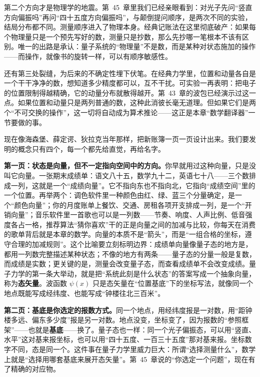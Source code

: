 第二个方向才是物理学的地震。第~45~章里我们已经亲眼看到：对光子先问“竖直方向偏振吗”再问“四十五度方向偏振吗”，与颠倒提问顺序，是两次不同的实验，结局分布都不同。测量顺序进入了物理本身。经典记账法在这里彻底破产：如果每个物理量只是一个预先写好的数，测量只是抄数，那么先抄哪一笔根本不该有区别。唯一的出路是承认：量子系统的“物理量”不是数，而是某种对状态施加的操作——而操作，就像书的旋转一样，可以有顺序敏感性。

还有第三处裂缝，为后来的不确定性埋下伏笔。在经典力学里，位置和动量各自是一个干干净净的数，想知道多少精度都可以，互不干扰。可实验一再表明：把电子的位置限制得越精确，它的动量分布就散得越开。第~43~章的波包已经演示过这一点。如果位置和动量只是两列普通的数，这种此消彼长毫无道理。但如果它们是两个“不可交换的操作”，这一切将自动成为算术推论——这正是本章“数学翻译器”一节要做的事。


现在像海森堡、薛定谔、狄拉克当年那样，把新账簿一页一页设计出来。我们要发明的概念只有四个，每一个都先给直觉，再给名字。

\textbf{第一页：状态是向量，但不一定指向空间中的方向。}你早就用过这种向量，只是没叫它向量。一张期末成绩单：语文八十五，数学九十二，英语七十八——三个数排成一列，这就是一个“成绩向量”。它不指向东也不指向北，它指向“成绩空间”里的一个位置。再举两个：调色软件里一种颜色由红、绿、蓝三个分量确定，是一个“颜色向量”；你的月度账单上餐饮、交通、房租各项开支排成一列，是一个“开销向量”；音乐软件里一首歌也可以是一列数——节奏、响度、人声比例、低音强度各占一格，推荐算法“猜你喜欢”干的正是向量之间的加减与比较，你每天在消费的歌单背后就是本章的数学。向量的本质不是“箭头”，而是“一组合格的坐标，遵守合理的加减规则”。这个比喻要立刻标明边界：成绩单向量像量子态的地方是，都用一列数完整描述某种状态；不像的地方有两条——量子态的分量一般是复数，而成绩是实数；更关键的是，测量会改变量子态，而查看成绩单不会改变成绩。量子力学的第一条大举动，就是把“系统此刻是什么状态”的答案写成一个抽象向量，称为\textbf{态矢量}。波函数 $\psi(x)$ 只是态矢量在“位置基底”下的坐标写法，就像同一个地点既能写成经纬度、也能写成“钟楼往北三百米”。

\textbf{第二页：基底是你选定的报数方式。}同一个地点，用经纬度报是一对数，用“距钟楼多远、偏东多少度”报是另一对数。地点没变，坐标变了，因为报数的“参照框架”——也就是\textbf{基底}——换了。量子态也一样：同一个光子偏振态，可以用“竖直、水平”这对基来报坐标，也可以用“四十五度、一百三十五度”那对基来报。坐标数字不同，态是同一个。这件事在量子力学里威力巨大：所谓“选择测量什么”，数学上就是“选择用哪套基底来展开态矢量”。第~45~章说的“你选定一个问题”，现在有了精确的对应物。

